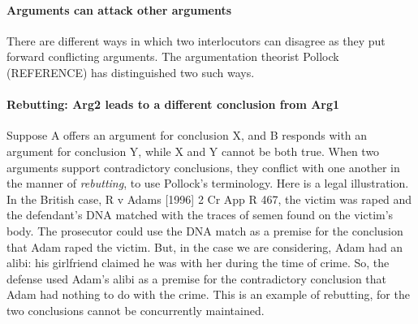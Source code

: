 \documentclass[10pt]{article}
\begin{document}
\paragraph{Arguments can attack other arguments}
		
		
		
There are different ways in which two interlocutors can disagree as they put forward 
conflicting arguments. The argumentation theorist Pollock (REFERENCE) has distinguished two such ways. 

\paragraph{	Rebutting: Arg2 leads to a different conclusion from Arg1}
		
		
Suppose A offers an argument for conclusion X, and B responds with an argument 
for conclusion Y, while X and Y cannot be both true. When two arguments support contradictory 
conclusions, they conflict with one another in the manner of \textit{rebutting}, 
to use Pollock's terminology. Here is a legal illustration. 
In the British case, R v Adams [1996] 2 Cr App R 467, the victim was raped and the defendant's DNA 
matched with the traces of semen found on the victim's body. %
The prosecutor could use the DNA match as a premise for the conclusion that Adam raped the victim. But, in the case we are considering, 
Adam had an alibi: his girlfriend claimed he was with her during 
the time of crime. So, the defense used Adam's alibi as a premise for the contradictory conclusion 
that Adam had nothing to do with the crime. This is an example of rebutting, for the two conclusions 
cannot be concurrently maintained. %
\end{document}
